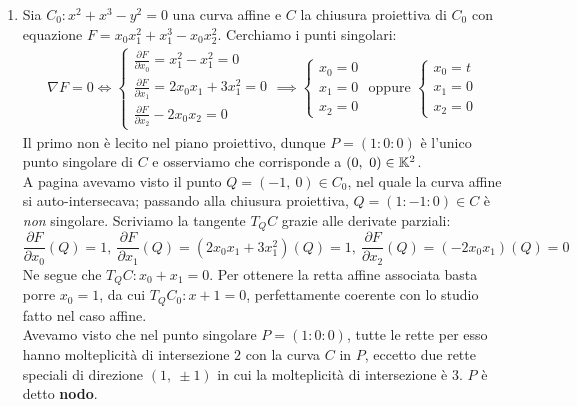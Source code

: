 \begin{examples} \label{esempi lez 35}
	\begin{enumerate}
		\item	Sia $C_0\colon x^2+x^3-y^2=0$ una curva affine e $C$ la chiusura proiettiva di $C_0$ con equazione $F=x_0x_1^2+x_1^3-x_0x_2^2$. Cerchiamo i punti singolari:
			\begin{gather*}
				\nabla F=0 \iff \begin{cases}
					\frac{\partial{F}}{\partial{x_0}}=x_1^2 - x_1^2=0\\
					\frac{\partial{F}}{\partial{x_1}}=2x_0x_1+3x_1^2=0\\
					\frac{\partial{F}}{\partial{x_2}}-2x_0x_2=0
				\end{cases} \implies \begin{cases}
					x_0=0 \\ x_1=0 \\ x_2=0
				\end{cases} \text{ oppure } \begin{cases}
					x_0=t \\ x_1=0 \\ x_2=0
				\end{cases}
			\end{gather*}
		Il primo non è lecito nel piano proiettivo, dunque $P=(1\colon 0\colon 0)$ è l'unico punto singolare di $C$ e osserviamo che corrisponde a $(0,\ 0)\in\kamp^2$.\\
		A pagina \pageref{esempiocurvaq} avevamo visto il punto $Q=(-1,\ 0)\in C_0$, nel quale la curva affine si auto-intersecava; passando alla chiusura proiettiva, $Q=(1\colon -1\colon 0)\in C$ è \textit{non} singolare. Scriviamo la tangente $T_Q C$ grazie alle derivate parziali:
		\begin{equation*}
			\frac{\partial{F}}{\partial{x_0}}\left(Q\right)=1,\ \frac{\partial{F}}{\partial{x_1}}\left(Q\right)=(2x_0x_1+3x_1^2)\left(Q\right)=1,\ \frac{\partial{F}}{\partial{x_2}}\left(Q\right)=(-2x_0x_1)\left(Q\right)=0
		\end{equation*}
		Ne segue che $T_Q C\colon x_0+x_1=0$. Per ottenere la retta affine associata basta porre $x_0=1$, da cui $T_Q C_0\colon x+1=0$, perfettamente coerente con lo studio fatto nel caso affine.\\
		Avevamo visto che nel punto singolare $P=(1\colon 0\colon 0)$, tutte le rette per esso hanno molteplicità di intersezione $2$ con la curva $C$ in $P$, eccetto due rette speciali di direzione $(1,\ \pm 1)$ in cui la molteplicità di intersezione è 3. $P$ è detto \textbf{nodo}. 

\end{enumerate}
\end{examples}
